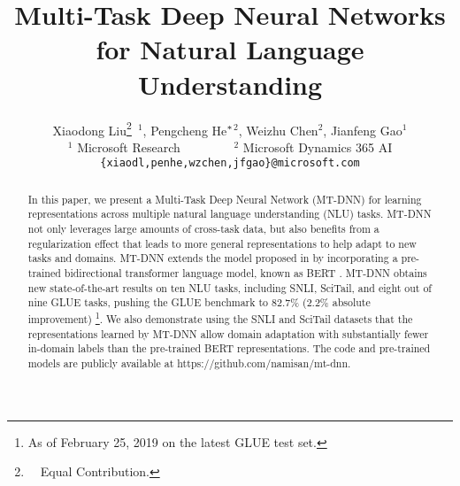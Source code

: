 \documentclass[11pt,a4paper]{article}
\title{Multi-Task Deep Neural Networks for Natural Language Understanding}
\author{Xiaodong Liu\thanks{~~Equal Contribution.}~$^1$, Pengcheng He$^\bold{\ast}$$^2$, Weizhu Chen$^2$, Jianfeng Gao$^1$ \\
  $^1$ Microsoft Research~~~~~~~~
  $^2$ Microsoft Dynamics 365 AI \\
  {\tt \{xiaodl,penhe,wzchen,jfgao\}@microsoft.com}
}
\date{}
\begin{document}
\maketitle

\begin{abstract}
In this paper, we present a Multi-Task Deep Neural Network (MT-DNN) for learning representations across multiple natural language understanding (NLU) tasks. MT-DNN not only leverages large amounts of cross-task data, but also benefits from a regularization effect that leads to more general representations to help adapt to new tasks and domains. MT-DNN extends the model proposed in \citet{liu2015mtl} by incorporating a pre-trained bidirectional transformer language model, known as BERT \citep{bert2018}. 
MT-DNN obtains new state-of-the-art results on ten NLU tasks, including SNLI, SciTail, and eight out of nine GLUE tasks, pushing the GLUE benchmark to 82.7\% (2.2\% absolute improvement) \footnote{As of February 25, 2019 on the latest GLUE test set.}. 
We also demonstrate using the SNLI and SciTail datasets that the representations learned by MT-DNN allow domain adaptation with substantially fewer in-domain labels than the pre-trained BERT representations.
The code and pre-trained models are publicly available at https://github.com/namisan/mt-dnn.
\end{abstract}














%
%


%
\end{document}
